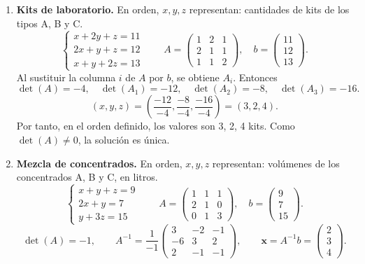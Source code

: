 \documentclass[11pt,a4paper]{article}
\begin{document}
\begin{enumerate}
\[\det(A)=3,\quad \det(A_1)=90,\quad \det(A_2)=60,\quad \det(A_3)=45.\]
\[(x,y,z)=\left(\frac{90}{3},\frac{60}{3},\frac{45}{3}\right)=(30,20,15).\]
Por tanto, en el orden definido, los valores son 30, 20, 15 dólares por día. Como $\det(A)\ne0$, la solución es única.
\item \textbf{Kits de laboratorio.} En orden, $x,y,z$ representan: cantidades de kits de los tipos A, B y C.
\[\begin{cases}x+2y+z=11\\2x+y+z=12\\x+y+2z=13\end{cases}\qquad A=\begin{pmatrix}1&2&1\\2&1&1\\1&1&2\end{pmatrix},\quad b=\begin{pmatrix}11\\12\\13\end{pmatrix}.\]
Al sustituir la columna $i$ de $A$ por $b$, se obtiene $A_i$. Entonces
\[\det(A)=-4,\quad \det(A_1)=-12,\quad \det(A_2)=-8,\quad \det(A_3)=-16.\]
\[(x,y,z)=\left(\frac{-12}{-4},\frac{-8}{-4},\frac{-16}{-4}\right)=(3,2,4).\]
Por tanto, en el orden definido, los valores son 3, 2, 4 kits. Como $\det(A)\ne0$, la solución es única.
\newpage
\item \textbf{Mezcla de concentrados.} En orden, $x,y,z$ representan: volúmenes de los concentrados A, B y C, en litros.
\[\begin{cases}x+y+z=9\\2x+y=7\\y+3z=15\end{cases}\qquad A=\begin{pmatrix}1&1&1\\2&1&0\\0&1&3\end{pmatrix},\quad b=\begin{pmatrix}9\\7\\15\end{pmatrix}.\]
\[\det(A)=-1,\qquad A^{-1}=\frac{1}{-1}\begin{pmatrix}3&-2&-1\\-6&3&2\\2&-1&-1\end{pmatrix},\qquad \mathbf{x}=A^{-1}b=\begin{pmatrix}2\\3\\4\end{pmatrix}.\]

\end{enumerate}
\end{document}
